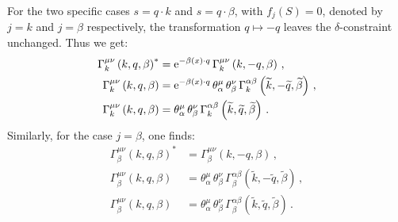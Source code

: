 \documentclass[prd,superscriptaddress,nofootinbib,notitlepage]{revtex4-1}
\newcommand{\e}{{\rm e}}
\begin{document}
%
For the two specific cases $s = q \cdot k$ and $s = q \cdot \beta$, with $f_j(S) = 0$, denoted by $j = k$ and $j = \beta$ respectively, 
the transformation $q \mapsto -q$ leaves the $\delta$-constraint unchanged. Thus we get:
%
\begin{subequations}\label{app: Gamma relations k}
    \begin{align}
        \Gamma^{\mu\nu}_{k}\left(k,q,\beta\right)^*
        &= \e^{-\beta(x)\cdot q}\,
        \Gamma^{\mu\nu}_{k}\left(k,-q,\beta\right)\, , \\
        \Gamma^{\mu\nu}_{k}\left(k,q,\beta\right)
        &= \e^{-\beta(x)\cdot q}\,
        \theta^\mu_{\alpha}\,\theta^\nu_{\beta}\,
        \Gamma^{\alpha\beta}_{k}\left(\widetilde{k},-\widetilde{q},\widetilde{\beta}\right)\, , \\
        \Gamma^{\mu\nu}_{k}\left(k,q,\beta\right)
        &= \theta^\mu_{\alpha}\,\theta^\nu_{\beta}\,
        \Gamma^{\alpha\beta}_{k}\left(\widetilde{k},\widetilde{q},\widetilde{\beta}\right)\, .
    \end{align}
\end{subequations}
%
Similarly, for the case $j = \beta$, one finds:
%
\begin{subequations}\label{app: Gamma relations beta}
    \begin{align}
        \Gamma^{\mu\nu}_{\beta}\left(k,q,\beta\right)^*
        &= \Gamma^{\mu\nu}_{\beta}\left(k,-q,\beta\right)\, , \\
        \Gamma^{\mu\nu}_{\beta}\left(k,q,\beta\right)
        &= \theta^\mu_{\alpha}\,\theta^\nu_{\beta}\,
        \Gamma^{\alpha\beta}_{\beta}\left(\widetilde{k},-\widetilde{q},\widetilde{\beta}\right)\, , \\
        \Gamma^{\mu\nu}_{\beta}\left(k,q,\beta\right)
        &= \theta^\mu_{\alpha}\,\theta^\nu_{\beta}\,
        \Gamma^{\alpha\beta}_{\beta}\left(\widetilde{k},\widetilde{q},\widetilde{\beta}\right)\, .
    \end{align}
\end{subequations}
%
\end{document}
